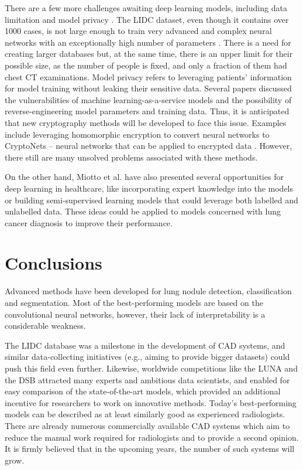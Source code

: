 \documentclass[12pt]{article}
\begin{document}
There are a few more challenges awaiting deep learning models, including data limitation and model privacy \citep{miotto2017deep}. The LIDC dataset, even though it contains over 1000 cases, is not large enough to train very advanced and complex neural networks with an exceptionally high number of parameters \citep{causey2018highly, miotto2017deep}. There is a need for creating larger databases but, at the same time, there is an upper limit for their possible size, as the number of people is fixed, and only a fraction of them had chest CT examinations. Model privacy refers to leveraging patients' information for model training without leaking their sensitive data. Several papers discussed the vulnerabilities of machine learning-as-a-service models and the possibility of reverse-engineering model parameters and training data. Thus, it is anticipated that new cryptography methods will be developed to face this issue. Examples include leveraging homomorphic encryption to convert neural networks to CryptoNets \--- neural networks that can be applied to encrypted data \citep{gilad2016cryptonets}. However, there still are many unsolved problems associated with these methods.

On the other hand, Miotto et al. have also presented several opportunities for deep learning in healthcare, like incorporating expert knowledge into the models or building semi-supervised learning models that could leverage both labelled and unlabelled data. These ideas could be applied to models concerned with lung cancer diagnosis to improve their performance. 

\section{Conclusions}
Advanced methods have been developed for lung nodule detection, classification and segmentation. Most of the best-performing models are based on the convolutional neural networks, however, their lack of  interpretability is a considerable weakness. 

The LIDC database was a milestone in the development of CAD systems, and similar data-collecting initiatives (e.g., aiming to provide bigger datasets) could push this field even further. Likewise, worldwide competitions like the LUNA and the DSB attracted many experts and ambitious data scientists, and enabled for easy comparison of the state-of-the-art models, which provided an additional incentive for researchers to work on innovative methods. Today's best-performing models can be described as at least similarly good as experienced radiologists. There are already numerous commercially available CAD systems which aim to reduce the manual work required for radiologists and to provide a second opinion. It is firmly believed that in the upcoming years, the number of such systems will grow.
\end{document}
